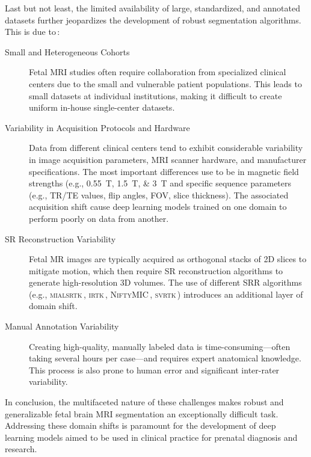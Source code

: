 Last but not least, the limited availability of large, standardized, and annotated datasets further jeopardizes the development of robust segmentation algorithms. This is due to\,\cite{FeTA2024_paper,FeTA2021_review, Ciceri2023}:
\begin{description}
    \item[Small and Heterogeneous Cohorts] Fetal MRI studies often require collaboration from specialized clinical centers due to the small and vulnerable patient populations. This leads to small datasets at individual institutions, making it difficult to create uniform in-house single-center datasets.
    \item[Variability in Acquisition Protocols and Hardware] Data from different clinical centers tend to exhibit considerable variability in image acquisition parameters, MRI scanner hardware, and manufacturer specifications. The most important differences use to be in magnetic field strengths (e.g., \qtylist{0.55;1.5;3}{\tesla} and specific sequence parameters (e.g., TR/TE values, flip angles, FOV, slice thickness). The associated acquisition shift cause deep learning models trained on one domain to perform poorly on data from another.
    \item[SR Reconstruction Variability] Fetal MR images are typically acquired as orthogonal stacks of 2D slices to mitigate motion, which then require SR reconstruction algorithms to generate high-resolution 3D volumes. The use of different SRR algorithms (e.g., \textsc{mialsrtk}\,\cite{Tourbier2015, MIALSRTK}, \textsc{irtk}\,\cite{Kuklisova2012, irtk-simple}, \textsc{NiftyMIC}\,\cite{Ebner2020}, \textsc{svrtk}\,\cite{Uus2022}) introduces an additional layer of domain shift.
    \item[Manual Annotation Variability] Creating high-quality, manually labeled data is time-consuming---often taking several hours per case---and requires expert anatomical knowledge. This process is also prone to human error and significant inter-rater variability.
\end{description}

In conclusion, the multifaceted nature of these challenges makes robust and generalizable fetal brain MRI segmentation an exceptionally difficult task. Addressing these domain shifts is paramount for the development of deep learning models aimed to be used in clinical practice for prenatal diagnosis and research.
